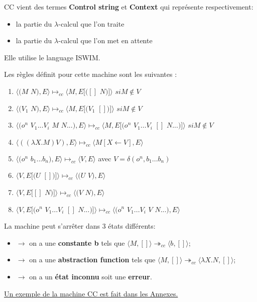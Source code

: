 \documentclass[10pt,a4paper]{article}
\begin{document}
			CC vient des termes \textbf{Control string} et \textbf{Context} qui représente respectivement:
			\begin{itemize}
				\item la partie du $\lambda$-calcul que l'on traite
				\item la partie du $\lambda$-calcul que l'on met en attente 
			\end{itemize}
			Elle utilise le language ISWIM.
			\bigbreak
			
			Les règles définit pour cette machine sont les suivantes :
			\begin{enumerate}
				\item $\langle(M$ $N),E\rangle \longmapsto_{cc} \langle M,E[([]$ $N)]\rangle$ $si M \notin V$
				\item $\langle(V_{1}$ $N),E\rangle \longmapsto_{cc}  \langle M,E[(V_{1}$ $[])]\rangle$ $ si M \notin V$
				\item $\langle(o^{n}$ $V_{1}...V_{i}$ $M$ $N ...),E\rangle \longmapsto_{cc}  
				\langle M,E[(o^{n}$ $V_{1}...V_{i}$ $[]$ $N ...)]\rangle$ $ si M \notin V$
				\item $\langle((\lambda X.M) V),E\rangle \longmapsto_{cc} \langle M[X\longleftarrow V],E\rangle$
				\item $\langle(o^{n}$ $b_{1}...b_{n}),E\rangle \longmapsto_{cc}  \langle V,E\rangle$ avec $V = \delta(o^{n},b_{1}...b_{n})$ 
				\item $\langle V,E[(U$ $[])]\rangle \longmapsto_{cc} \langle(U$ $V),E\rangle$ 
				\item $\langle V,E[[]$ $N)]\rangle \longmapsto_{cc} \langle(V$ $N),E\rangle$ 
				\item $\langle V,E[(o^{n}$ $V_{1}...V_{i}$ $[]$ $N ...)]\rangle \longmapsto_{cc} \langle(o^{n}$ $V_{1}...V_{i}$ $V$ $N ...),E\rangle$ 
			\end{enumerate}
			\bigbreak
			
			La machine peut s'arrêter dans 3 états différents:
			\begin{itemize}
				\item[]$\longrightarrow$ on a une \textbf{constante b} tels que $\langle M,[]\rangle \twoheadrightarrow_{cc} \langle b,[]\rangle$;
				\item[]$\longrightarrow$ on a une \textbf{abstraction function} tels que $\langle M,[]\rangle \twoheadrightarrow_{cc} \langle\lambda X.N,[]\rangle$;
				\item[]$\longrightarrow$ on a un \textbf{état inconnu} soit une \textbf{erreur}.
			\end{itemize}
			\hyperref[CC]{Un exemple de la machine CC est fait dans les Annexes.}
			\bigbreak
			
\end{document}
